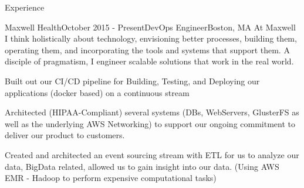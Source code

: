 \documentclass{resume} %
\begin{document}
\begin{rSection}{Experience}

\begin{rSubsection}{Maxwell Health}{October 2015 - Present}{DevOps Engineer}{Boston, MA}
At Maxwell I think holistically about technology, envisioning better processes, building them, operating them, and incorporating the tools and systems that support them. A disciple of pragmatism, I engineer scalable solutions that work in the real world.
\item Built out our CI/CD pipeline for Building, Testing, and Deploying our applications (docker based) on a continuous stream
\item Architected (HIPAA-Compliant) several systems (DBs, WebServers, GlusterFS as well as the underlying AWS Networking) to support our ongoing commitment to deliver our product to customers.
\item Created and architected an event sourcing stream with ETL for us to analyze our data, BigData related, allowed us to gain insight into our data. (Using AWS EMR - Hadoop to perform expensive computational tasks)
\end{rSubsection}




\end{rSection}
\end{document}
